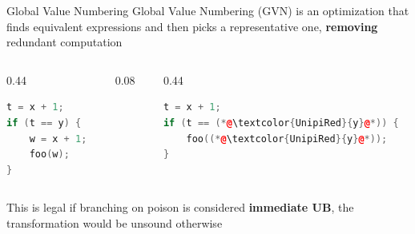 \begin{frame}[fragile]{Global Value Numbering}
  Global Value Numbering (GVN) is an optimization that finds equivalent expressions and then picks a representative one, \textbf{removing} redundant computation
    \begin{columns}[c]
        \begin{column}{0.44\textwidth}
           \begin{lstlisting}[language=C++, frame=single, xleftmargin=4pt, xrightmargin=4pt]
t = x + 1;
if (t == y) {
    w = x + 1;
    foo(w);
}
           \end{lstlisting} 
        \end{column}
        \begin{column}{0.08\textwidth}
            \transform        
        \end{column}
        \begin{column}{0.44\textwidth}
           \begin{lstlisting}[language=C++, frame=single, xleftmargin=4pt, xrightmargin=4pt]
t = x + 1;
if (t == (*@\textcolor{UnipiRed}{y}@*)) {
    foo((*@\textcolor{UnipiRed}{y}@*));
}
           \end{lstlisting} 
        \end{column}
    \end{columns}
    This is legal if branching on poison is considered \textbf{immediate UB}, the transformation would be unsound otherwise
\end{frame}
